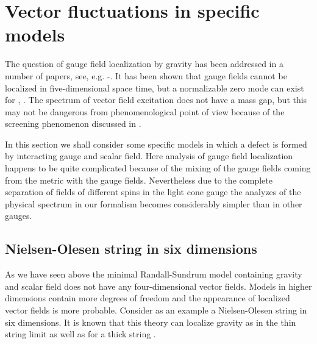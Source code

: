 \documentclass[a4paper,12pt]{article}
\begin{document}
\section{Vector fluctuations in specific models}
The question of gauge field localization by gravity has been
addressed in a number of papers, see, e.g.
\cite{Oda:2000zc}-\cite{Giovannini:2002jf}. It has been shown that
gauge fields cannot be localized in five-dimensional space time, but
a normalizable zero mode can exist for \coordHE{}, \coordHE{}. The
spectrum of vector field excitation does not have a mass gap, but
this may not be dangerous from phenomenological point of view because
of the screening phenomenon discussed in \cite{Dubovsky:2002xv}.

In this section we shall consider some specific models in which a
defect is formed by interacting gauge and scalar field. Here
analysis of gauge field localization happens to be quite
complicated because of the mixing of the gauge fields coming from
the metric with the gauge fields. Nevertheless due to the complete
separation of fields of different spins in the light cone gauge
the analyzes of the physical spectrum in our formalism  becomes
considerably simpler than in other gauges.

\subsection{Nielsen-Olesen string in six dimensions}
As we have seen above the minimal Randall-Sundrum model  containing
gravity and scalar field does not have any four-dimensional vector
fields. Models in higher dimensions contain more degrees of freedom
and the appearance of localized vector fields is more probable.
Consider as an example a Nielsen-Olesen string in six dimensions. It
is known that this theory can localize gravity as in the thin string
limit \cite{Gherghetta:2000qi} as well as for a thick string
\cite{Giovannini:2001hh}.
\end{document}
